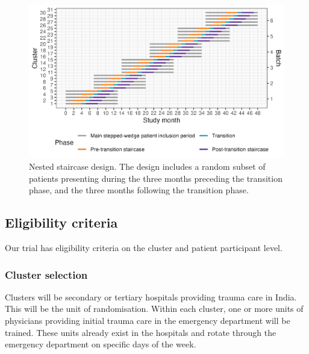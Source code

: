\documentclass[
]{scrartcl}
\begin{document}
\begin{figure}

{\centering \includegraphics[width=5.9in,height=\textheight]{trial-design-figure-30-clusters-5-sequences-6-batches-6-batches-overlap-4-min-standard-care-4-min-intervention-1-transition-months-0-transition-overlap.3-staircase-months.png}

}

\caption{\label{fig-nested-staircase-design}Nested staircase design. The
design includes a random subset of patients presenting during the three
months preceding the transition phase, and the three months following
the transition phase.}

\end{figure}

\hypertarget{eligibility-criteria}{%
\subsection{Eligibility criteria}\label{eligibility-criteria}}

Our trial has eligibility criteria on the cluster and patient
participant level.

\hypertarget{cluster-selection}{%
\subsubsection{Cluster selection}\label{cluster-selection}}

Clusters will be secondary or tertiary hospitals providing trauma care
in India. This will be the unit of randomisation. Within each cluster,
one or more units of physicians providing initial trauma care in the
emergency department will be trained. These units already exist in the
hospitals and rotate through the emergency department on specific days
of the week.
\end{document}
